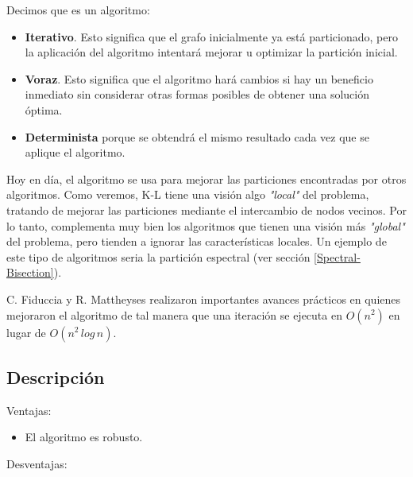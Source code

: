 Decimos que es un algoritmo:

\begin{itemize}
	\setlength{\parskip}{0pt}
	\setlength{\itemsep}{0pt plus 1pt}
	\item \textbf{Iterativo}. Esto significa que el grafo inicialmente ya está particionado, pero la aplicación del algoritmo intentará mejorar u optimizar la partición inicial. 
	\item \textbf{Voraz}. Esto significa que el algoritmo hará cambios si hay un beneficio inmediato sin considerar otras formas posibles de obtener una solución óptima.
	\item \textbf{Determinista} porque se obtendrá el mismo resultado cada vez que se aplique el algoritmo. %
\end{itemize}


Hoy en día, el algoritmo se usa para mejorar las particiones encontradas por otros algoritmos. Como veremos, K-L tiene una visión algo \textit{"local"} del problema, tratando de mejorar las particiones mediante el intercambio de nodos vecinos. Por lo tanto, complementa muy bien los algoritmos que tienen una visión más \textit{"global"} del problema, pero tienden a ignorar las características locales. Un ejemplo de este tipo de algoritmos seria la partición espectral (ver sección \ref{Spectral-Bisection}).

C. Fiduccia y R. Mattheyses realizaron importantes avances prácticos en \cite{FiducciaMattheyses} quienes mejoraron el algoritmo de tal manera que una iteración se ejecuta en $O({n}^2)$ en lugar de $O({n}^2 \, log \, n)$.

\subsection{Descripción}

Ventajas:

\begin{itemize}
	\item El algoritmo es robusto.
\end{itemize}

Desventajas:

